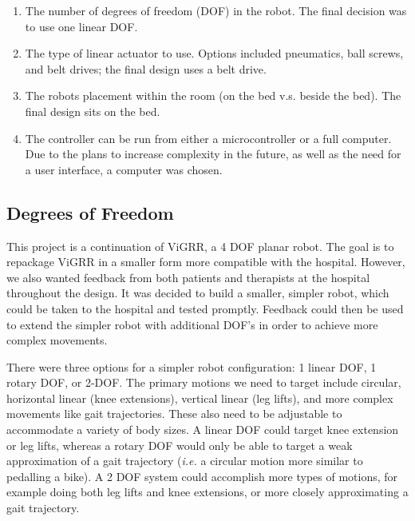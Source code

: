 \documentclass[12pt]{report}
\begin{document}
	\begin{enumerate}
		\item The number of degrees of freedom (DOF) in the robot. The final decision was to use one linear DOF.
		\item The type of linear actuator to use. Options included pneumatics, ball screws, and belt drives; the final design uses a belt drive.
		\item The robots placement within the room (on the bed v.s. beside the bed). The final design sits on the bed.
		\item The controller can be run from either a microcontroller or a full computer. Due to the plans to increase complexity in the future, as well as the need for a user interface, a computer was chosen. 
	\end{enumerate}
	
	
		\subsection{Degrees of Freedom}
		
		This project is a continuation of ViGRR, a 4 DOF planar robot. The goal is to repackage ViGRR in a smaller form more compatible with the hospital. However, we also wanted feedback from both patients and therapists at the hospital throughout the design. It was decided to build a smaller, simpler robot, which could be taken to the hospital and tested promptly. Feedback could then be used to extend the simpler robot with additional DOF's in order to achieve more complex movements.
		
		There were three options for a simpler robot configuration: 1 linear DOF, 1 rotary DOF, or 2-DOF. The primary motions we need to target include circular, horizontal linear (knee extensions), vertical linear (leg lifts), and more complex movements like gait trajectories. These also need to be adjustable to accommodate a variety of body sizes. A linear DOF could target knee extension or leg lifts, whereas a rotary DOF would only be able to target a weak approximation of a gait trajectory (\textit{i.e.} a circular motion more similar to pedalling a bike). A 2 DOF system could accomplish more types of motions, for example doing both leg lifts and knee extensions, or more closely approximating a gait trajectory.
		
\end{document}
